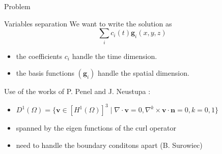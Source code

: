 \documentclass{beamer}
\renewcommand{\div}{{\nabla\cdot}}
\begin{document}
\begin{frame}{Problem}
  \begin{block}{Variables separation}
    We want to write the solution as
    \[ \sum_i c_i(t) \mathbf{g}_i(x,y,z) \]
    \begin{itemize}
    \item the coefficients $c_i$ handle the time dimension.
    \item the basis functions $(\mathbf{g}_i)$ handle the spatial dimension.
    \end{itemize}
  \end{block}
  Use of the works of P. Penel and J. Neustupa \cite{Penel2004} :
  \begin{itemize}
  \item $D^1(\Omega) = \{\mathbf{v} \in [H^1(\Omega)]^3\; |\; \div\mathbf{v}=0,\nabla^k\times \mathbf{v}\cdot \mathbf{n} = 0, k=0,1 \}$
  \item spanned by the eigen functions of the curl operator
  \item need to handle the boundary conditons apart (B. Surowiec)
  \end{itemize}
\end{frame}
\end{document}
